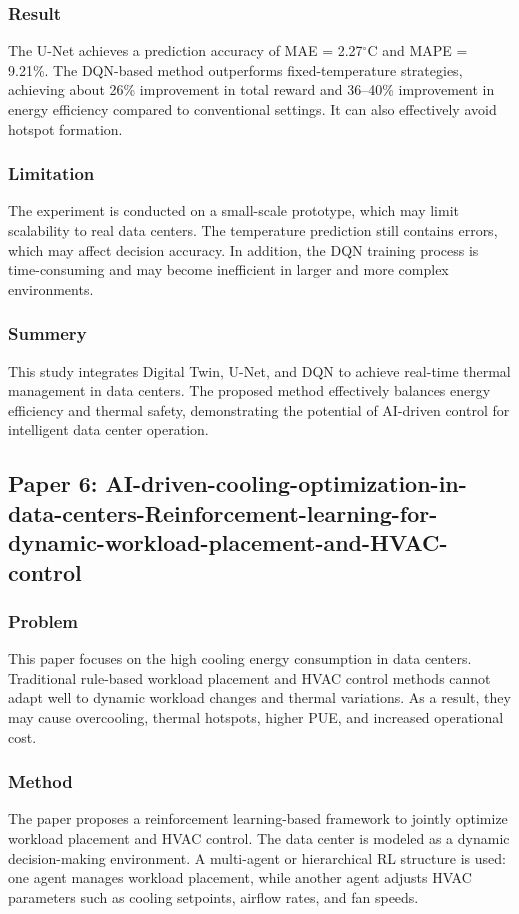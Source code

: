 \documentclass[12pt,a4paper]{article}
\begin{document}
    \subsubsection{Result}
    
    The U-Net achieves a prediction accuracy of MAE = 2.27$^\circ$C and MAPE = 9.21\%. The DQN-based method outperforms fixed-temperature strategies, achieving about 26\% improvement in total reward and 36--40\% improvement in energy efficiency compared to conventional settings. It can also effectively avoid hotspot formation.

    \subsubsection{Limitation}
    The experiment is conducted on a small-scale prototype, which may limit scalability to real data centers. The temperature prediction still contains errors, which may affect decision accuracy. In addition, the DQN training process is time-consuming and may become inefficient in larger and more complex environments.

    \subsubsection{Summery}
    This study integrates Digital Twin, U-Net, and DQN to achieve real-time thermal management in data centers. The proposed method effectively balances energy efficiency and thermal safety, demonstrating the potential of AI-driven control for intelligent data center operation.
\newpage

\subsection{Paper 6: AI-driven-cooling-optimization-in-data-centers-Reinforcement-learning-for-dynamic-workload-placement-and-HVAC-control}
    \subsubsection{Problem}
    This paper focuses on the high cooling energy consumption in data centers. Traditional rule-based workload placement and HVAC control methods cannot adapt well to dynamic workload changes and thermal variations. As a result, they may cause overcooling, thermal hotspots, higher PUE, and increased operational cost.

    \subsubsection{Method}
    The paper proposes a reinforcement learning-based framework to jointly optimize workload placement and HVAC control. The data center is modeled as a dynamic decision-making environment. A multi-agent or hierarchical RL structure is used: one agent manages workload placement, while another agent adjusts HVAC parameters such as cooling setpoints, airflow rates, and fan speeds.
\end{document}
